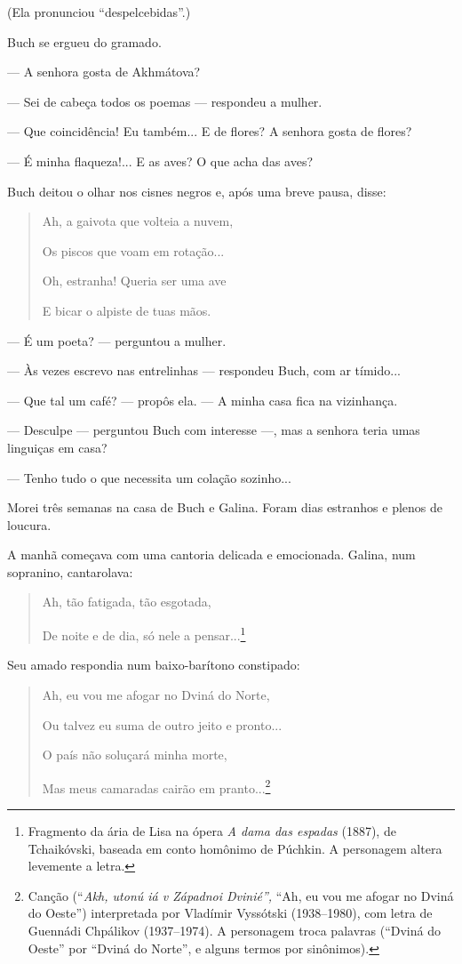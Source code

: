 (Ela pronunciou ``despelcebidas''.)

Buch se ergueu do gramado.

--- A senhora gosta de Akhmátova?

--- Sei de cabeça todos os poemas --- respondeu a mulher.

--- Que coincidência! Eu também... E de flores? A senhora gosta de
flores?

--- É minha flaqueza!... E as aves? O que acha das aves?

Buch deitou o olhar nos cisnes negros e, após uma breve pausa, disse:

\begin{quote}
Ah, a gaivota que volteia a nuvem,

Os piscos que voam em rotação...

Oh, estranha! Queria ser uma ave

E bicar o alpiste de tuas mãos.
\end{quote}

--- É um poeta? --- perguntou a mulher.

--- Às vezes escrevo nas entrelinhas --- respondeu Buch, com ar
tímido...

--- Que tal um café? --- propôs ela. --- A minha casa fica na
vizinhança.

--- Desculpe --- perguntou Buch com interesse ---, mas a senhora teria
umas linguiças em casa?

--- Tenho tudo o que necessita um colação sozinho...

Morei três semanas na casa de Buch e Galina. Foram dias estranhos e
plenos de loucura.

A manhã começava com uma cantoria delicada e emocionada. Galina, num
sopranino, cantarolava:

\begin{quote}
Ah, tão fatigada, tão esgotada,

De noite e de dia, só nele a pensar...\footnote{Fragmento da ária de
  Lisa na ópera \emph{A dama das espadas} (1887), de Tchaikóvski,
  baseada em conto homônimo de Púchkin. A personagem altera levemente a
  letra.}
\end{quote}

Seu amado respondia num baixo-barítono constipado:

\begin{quote}
Ah, eu vou me afogar no Dviná do Norte,

Ou talvez eu suma de outro jeito e pronto...

O país não soluçará minha morte,

Mas meus camaradas cairão em pranto...\footnote{Canção (``\emph{Akh,
  utonú iá v Západnoi Dvinié'',} ``Ah, eu vou me afogar no Dviná do
  Oeste'') interpretada por Vladímir Vyssótski (1938--1980), com letra
  de Guennádi Chpálikov (1937--1974). A personagem troca palavras
  (``Dviná do Oeste'' por ``Dviná do Norte'', e alguns termos por
  sinônimos).}
\end{quote}

